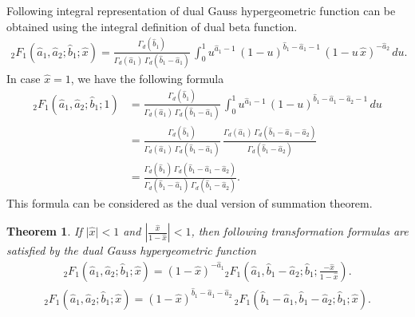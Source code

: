 \documentclass[11pt,a4paper,fleqn]{article}
\newtheorem{theorem}{Theorem}
\numberwithin{equation}{section}
\numberwithin{lemma}{section}
\numberwithin{theorem}{section}
\numberwithin{corollary}{section}
\begin{document}
Following integral representation of dual Gauss hypergeometric function can be obtained using the integral definition of dual beta function.
\begin{align}
{}_2F_1 (\widehat{a}_1, \widehat{a}_2; \widehat{b}_1;  \widehat{x}) = \frac{\Gamma_d(\widehat{b}_1)}{\Gamma_d(\widehat{a}_1) \, \Gamma_d(\widehat{b}_1 - \widehat{a}_1)} \,  \int_{0}^{1} u^{\widehat{a}_1 - 1} \, (1 - u)^{\widehat{b}_1 - \widehat{a}_1 - 1} \, (1 - u \, \widehat{x})^{-\widehat{a}_2} \, du.
\end{align}
In case $\widehat{x}  = 1$, we have the following formula
\begin{align}
	{}_2F_1 (\widehat{a}_1, \widehat{a}_2; \widehat{b}_1;  1) & = \frac{\Gamma_d(\widehat{b}_1)}{\Gamma_d(\widehat{a}_1) \, \Gamma_d(\widehat{b}_1 - \widehat{a}_1)} \,  \int_{0}^{1} u^{\widehat{a}_1 - 1} \, (1 - u)^{\widehat{b}_1 - \widehat{a}_1 -\widehat{a}_2 - 1}  \, du\nonumber\\
	& = \frac{\Gamma_d(\widehat{b}_1)}{\Gamma_d(\widehat{a}_1) \, \Gamma_d(\widehat{b}_1 - \widehat{a}_1)} \,  \frac{\Gamma_d(\widehat{a}_1) \, \Gamma_d (\widehat{b}_1 - \widehat{a}_1 -\widehat{a}_2)}{ \Gamma_d(\widehat{b}_1 - \widehat{a}_2)}\nonumber\\
	& =  \frac{\Gamma_d(\widehat{b}_1) \, \Gamma_d (\widehat{b}_1 - \widehat{a}_1 -\widehat{a}_2)}{\Gamma_d(\widehat{b}_1 - \widehat{a}_1) \, \Gamma_d(\widehat{b}_1 - \widehat{a}_2)}.
\end{align}
This formula can be considered as the dual version of summation theorem. 
\begin{theorem}
	If $\vert \widehat{x} \vert < 1$ and $\left\vert\frac{\widehat{x}}{1 - \widehat{x}}\right \vert < 1$, then following transformation formulas are satisfied by the dual Gauss hypergeometric function
	\begin{align}
		{}_2F_1 (\widehat{a}_1, \widehat{a}_2; \widehat{b}_1; \widehat{x}) = (1 - \widehat{x})^{-\widehat{a}_1} {}_2F_1 \left(\widehat{a}_1, \widehat{b}_1 - \widehat{a}_2; \widehat{b}_1; \frac{-\widehat{x}}{1 - \widehat{x}}\right).\label{5.31}
	\end{align}
\begin{align}
	{}_2F_1 (\widehat{a}_1, \widehat{a}_2; \widehat{b}_1; \widehat{x}) = (1 - \widehat{x})^{\widehat{b}_1 - \widehat{a}_1 - \widehat{a}_2} \, {}_2F_1 (\widehat{b}_1 - \widehat{a}_1, \widehat{b}_1 - \widehat{a}_2; \widehat{b}_1; \widehat{x}).\label{2.5.4}
\end{align}
\end{theorem}
\end{document}
